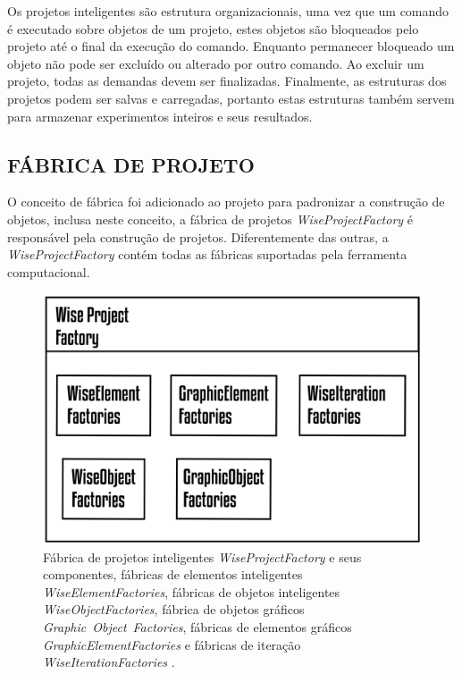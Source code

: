 Os projetos inteligentes são estrutura organizacionais, uma vez que um comando é executado sobre objetos de um projeto, estes objetos são bloqueados pelo projeto até o final da execução do comando. Enquanto permanecer bloqueado um objeto não pode ser excluído ou alterado por outro comando. Ao excluir um projeto, todas as demandas devem ser finalizadas. Finalmente, as estruturas dos projetos podem ser salvas e carregadas, portanto estas estruturas também servem para armazenar experimentos inteiros e seus resultados.

\subsection{FÁBRICA DE PROJETO}\label{sec:fabrica_projeto} 

O conceito de fábrica foi adicionado ao projeto para padronizar a construção de objetos, inclusa neste conceito, a fábrica de projetos \textit{WiseProjectFactory} é responsável pela construção de projetos. Diferentemente das outras, a  \textit{WiseProjectFactory} contém todas as fábricas suportadas pela ferramenta computacional.

\begin{figure}[!htbp]
	\centering
	\includegraphics[scale=1.5]{Figures/WiseProjectFactory@16x.png}
	\caption{Fábrica de projetos inteligentes \textit{WiseProjectFactory} e seus componentes, fábricas de elementos inteligentes \textit{WiseElementFactories}, fábricas de objetos inteligentes \textit{WiseObjectFactories}, fábrica de objetos gráficos \emph{Gra}\-\emph{phic}~\-\emph{Object}~\-\emph{Facto\-ries}, fábricas de elementos gráficos \textit{GraphicElementFactories} e fábricas de iteração \textit{WiseIterationFactories} .}
	\label{fig7:projectfactory}
\end{figure}

